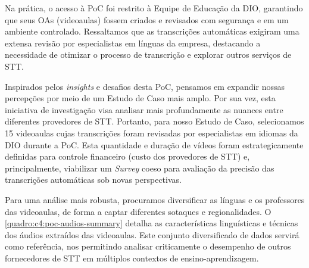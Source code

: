 Na prática, o acesso à PoC foi restrito à Equipe de Educação da DIO, garantindo que seus OAs (videoaulas) fossem criados e revisados com segurança e em um ambiente controlado. Ressaltamos que as transcrições automáticas exigiram uma extensa revisão por especialistas em línguas da empresa, destacando a necessidade de otimizar o processo de transcrição e explorar outros serviços de STT.

Inspirados pelos \textit{insights} e desafios desta PoC, pensamos em expandir nossas percepções por meio de um Estudo de Caso mais amplo. Por sua vez, esta iniciativa de investigação visa analisar mais profundamente as nuances entre diferentes provedores de STT. Portanto, para nosso Estudo de Caso, selecionamos 15 videoaulas cujas transcrições foram revisadas por especialistas em idiomas da DIO durante a PoC. Esta quantidade e duração de vídeos foram estrategicamente definidas para controle financeiro (custo dos provedores de STT) e, principalmente, viabilizar um \textit{Survey} coeso para avaliação da precisão das transcrições automáticas sob novas perspectivas.

Para uma análise mais robusta, procuramos diversificar as línguas e os professores das videoaulas, de forma a captar diferentes sotaques e regionalidades. O \autoref{quadro:c4:poc-audios-summary} detalha as características linguísticas e técnicas dos áudios extraídos das videoaulas. Este conjunto diversificado de dados servirá como referência, nos permitindo analisar criticamente o desempenho de outros fornecedores de STT em múltiplos contextos de ensino-aprendizagem.

